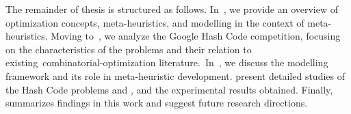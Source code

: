 The remainder of thesis is structured as follows. In~, we
provide an overview of optimization concepts, meta-heuristics, and modelling in
the context of meta-heuristics. Moving to~, we
analyze the Google Hash Code competition, focusing on the characteristics of the
problems and their relation to existing~\acrshort{combinatorial-optimization}
literature.~In~, we discuss the modelling
framework and its role in meta-heuristic development.
 present detailed studies of the
Hash Code problems  and , and the experimental results obtained.  Finally,~
summarizes findings in this work and suggest future research directions.